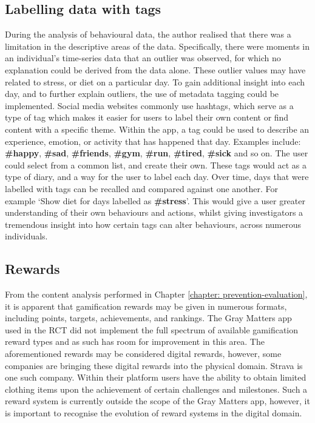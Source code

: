 \subsection{Labelling data with tags}
During the analysis of behavioural data, the author realised that there was a limitation in the descriptive areas of the data. Specifically, there were moments in an individual's time-series data that an outlier was observed, for which no explanation could be derived from the data alone. These outlier values may have related to stress, or diet on a particular day.
To gain additional insight into each day, and to further explain outliers, the use of metadata tagging could be implemented. Social media websites commonly use hashtags, which serve as a type of tag which makes it easier for users to label their own content or find content with a specific theme.
\newline Within the app, a tag could be used to describe an experience, emotion, or activity that has happened that day. Examples include: \textbf{\#happy}, \textbf{\#sad}, \textbf{\#friends}, \textbf{\#gym}, \textbf{\#run}, \textbf{\#tired}, \textbf{\#sick} and so on. The user could select from a common list, and create their own. These tags would act as a type of diary, and a way for the user to label each day. Over time, days that were labelled with tags can be recalled and compared against one another. For example `Show diet for days labelled as \textbf{\#stress}'.
This would give a user greater understanding of their own behaviours and actions, whilst giving investigators a tremendous insight into how certain tags can alter behaviours, across numerous individuals.

\subsection{Rewards}
From the content analysis performed in Chapter \ref{chapter: prevention-evaluation}, it is apparent that gamification rewards may be given in numerous formats, including points, targets, achievements, and rankings. The Gray Matters app used in the RCT did not implement the full spectrum of available gamification reward types and as such has room for improvement in this area. The aforementioned rewards may be considered digital rewards, however, some companies are bringing these digital rewards into the physical domain. Strava is one such company. Within their platform users have the ability to obtain limited clothing items upon the achievement of certain challenges and milestones. Such a reward system is currently outside the scope of the Gray Matters app, however, it is important to recognise the evolution of reward systems in the digital domain.

